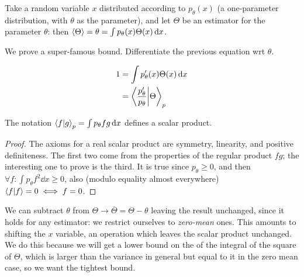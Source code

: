 \documentclass[main.tex]{subfiles}
\begin{document}
Take a random variable \( x \) distributed according to \(p_\theta (x)\) (a one-parameter distribution, with \(\theta\) as the parameter), and let \(\Theta\) be an estimator for the parameter \(\theta\): then \( \expval{\Theta} = \theta = \int  p_\theta(x) \Theta(x) \dd{x}  \).

We prove a super-famous bound. Differentiate the previous equation wrt \( \theta \).

\begin{subequations}\label{eq:classical-crao-start}
\begin{align}
  1 &= \int  p' _\theta (x) \Theta (x) \dd{x}   \\
  &= \braket{\frac{p'_\theta}{p_\theta}}{\Theta}_p \label{eq:classical-crao-start-subeq}
\end{align}
\end{subequations}


\begin{claim}
The notation \( \braket{f}{g}_p = \int  p_\theta f g \dd{x}  \) defines a scalar product.
\end{claim}

\begin{bluebox}
\begin{proof}
  The axioms for a real scalar product are symmetry, linearity, and positive definiteness. The first two come from the properties of the regular product \(fg\); the interesting one to prove is the third. It is true since \(p_ \theta \geq 0\), and then \(\forall f: \int  p_ \theta f^2  \dd{x} \geq 0 \), also (modulo equality almost everywhere) \(\braket{f}{f}=0 \iff f=0\).
\end{proof}
\end{bluebox}

We can subtract \( \theta \) from \(\Theta \rightarrow \overline{\Theta} = \Theta - \theta \) leaving the result unchanged, since it holds for any estimator: we restrict ourselves to \emph{zero-mean} ones. This amounts to shifting the \(x\) variable, an operation which leaves the scalar product unchanged.
We do this because we will get a lower bound on the  of the integral of the square of \(\Theta\), which is larger than the variance in general but equal to it in the zero mean case, so we want the tightest bound.


%
\end{document}
